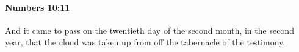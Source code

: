 
		\paragraph{Numbers 10:11} %
			\label{NUMBERS-10-11}

			And it came to pass on the twentieth day of the second month, in the second year, that the cloud was taken up from off the tabernacle of the testimony.



